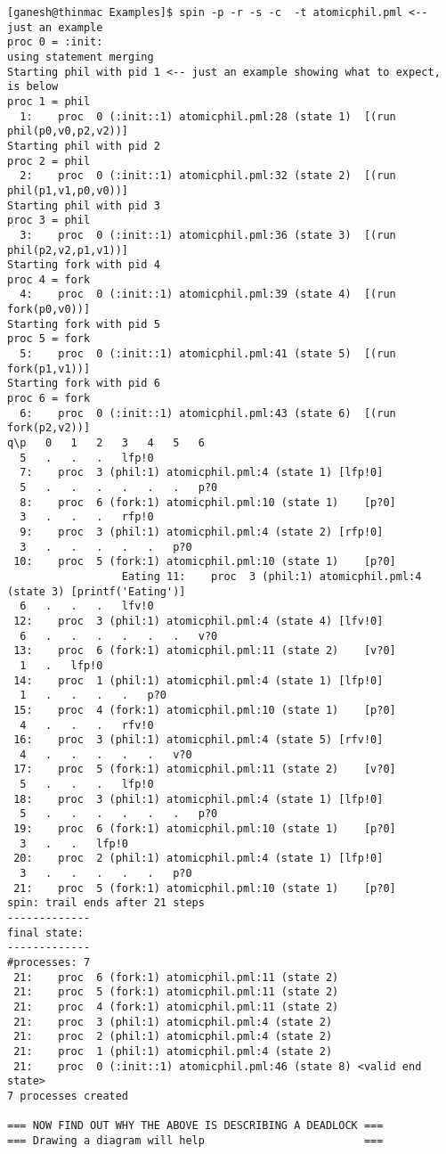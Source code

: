 \documentclass[11pt]{article}
\begin{document}
\begin{scriptsize}
\begin{verbatim}
[ganesh@thinmac Examples]$ spin -p -r -s -c  -t atomicphil.pml <-- just an example
proc 0 = :init:
using statement merging
Starting phil with pid 1 <-- just an example showing what to expect, is below
proc 1 = phil
  1:	proc  0 (:init::1) atomicphil.pml:28 (state 1)	[(run phil(p0,v0,p2,v2))]
Starting phil with pid 2
proc 2 = phil
  2:	proc  0 (:init::1) atomicphil.pml:32 (state 2)	[(run phil(p1,v1,p0,v0))]
Starting phil with pid 3
proc 3 = phil
  3:	proc  0 (:init::1) atomicphil.pml:36 (state 3)	[(run phil(p2,v2,p1,v1))]
Starting fork with pid 4
proc 4 = fork
  4:	proc  0 (:init::1) atomicphil.pml:39 (state 4)	[(run fork(p0,v0))]
Starting fork with pid 5
proc 5 = fork
  5:	proc  0 (:init::1) atomicphil.pml:41 (state 5)	[(run fork(p1,v1))]
Starting fork with pid 6
proc 6 = fork
  6:	proc  0 (:init::1) atomicphil.pml:43 (state 6)	[(run fork(p2,v2))]
q\p   0   1   2   3   4   5   6
  5   .   .   .   lfp!0
  7:	proc  3 (phil:1) atomicphil.pml:4 (state 1)	[lfp!0]
  5   .   .   .   .   .   .   p?0
  8:	proc  6 (fork:1) atomicphil.pml:10 (state 1)	[p?0]
  3   .   .   .   rfp!0
  9:	proc  3 (phil:1) atomicphil.pml:4 (state 2)	[rfp!0]
  3   .   .   .   .   .   p?0
 10:	proc  5 (fork:1) atomicphil.pml:10 (state 1)	[p?0]
                  Eating 11:	proc  3 (phil:1) atomicphil.pml:4 (state 3)	[printf('Eating')]
  6   .   .   .   lfv!0
 12:	proc  3 (phil:1) atomicphil.pml:4 (state 4)	[lfv!0]
  6   .   .   .   .   .   .   v?0
 13:	proc  6 (fork:1) atomicphil.pml:11 (state 2)	[v?0]
  1   .   lfp!0
 14:	proc  1 (phil:1) atomicphil.pml:4 (state 1)	[lfp!0]
  1   .   .   .   .   p?0
 15:	proc  4 (fork:1) atomicphil.pml:10 (state 1)	[p?0]
  4   .   .   .   rfv!0
 16:	proc  3 (phil:1) atomicphil.pml:4 (state 5)	[rfv!0]
  4   .   .   .   .   .   v?0
 17:	proc  5 (fork:1) atomicphil.pml:11 (state 2)	[v?0]
  5   .   .   .   lfp!0
 18:	proc  3 (phil:1) atomicphil.pml:4 (state 1)	[lfp!0]
  5   .   .   .   .   .   .   p?0
 19:	proc  6 (fork:1) atomicphil.pml:10 (state 1)	[p?0]
  3   .   .   lfp!0
 20:	proc  2 (phil:1) atomicphil.pml:4 (state 1)	[lfp!0]
  3   .   .   .   .   .   p?0
 21:	proc  5 (fork:1) atomicphil.pml:10 (state 1)	[p?0]
spin: trail ends after 21 steps
-------------
final state:
-------------
#processes: 7
 21:	proc  6 (fork:1) atomicphil.pml:11 (state 2)
 21:	proc  5 (fork:1) atomicphil.pml:11 (state 2)
 21:	proc  4 (fork:1) atomicphil.pml:11 (state 2)
 21:	proc  3 (phil:1) atomicphil.pml:4 (state 2)
 21:	proc  2 (phil:1) atomicphil.pml:4 (state 2)
 21:	proc  1 (phil:1) atomicphil.pml:4 (state 2)
 21:	proc  0 (:init::1) atomicphil.pml:46 (state 8) <valid end state>
7 processes created

=== NOW FIND OUT WHY THE ABOVE IS DESCRIBING A DEADLOCK ===
=== Drawing a diagram will help                         ===
\end{verbatim}
\end{scriptsize}
\end{document}
